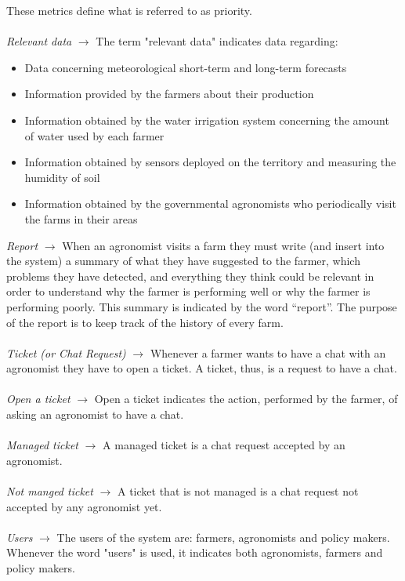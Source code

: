 \documentclass[10pt]{report}
\begin{document}
    These metrics define what is referred to as priority.
    \\ \\
    \emph{Relevant data} $\rightarrow$ The term "relevant data" indicates data regarding:
    \begin{itemize}
        \item Data concerning meteorological short-term and long-term forecasts
        \item Information provided by the farmers about their production
        \item Information obtained by the water irrigation system concerning the amount of water used by each farmer
        \item Information obtained by sensors deployed on the territory and measuring the humidity of soil
        \item Information obtained by the governmental agronomists who periodically visit the farms in their areas
    \end{itemize}
    \emph{Report} $\rightarrow$ When an agronomist visits a farm they must write (and insert into the system) a summary of what they have suggested to the farmer, which problems they have detected, and everything they think could be relevant in order to understand why the farmer is performing well or why the farmer is performing poorly. This summary is indicated by the word “report”. The purpose of the report is to keep track of the history of every farm.
    \\ \\
    \emph{Ticket (or Chat Request)} $\rightarrow$ Whenever a farmer wants to have a chat with an agronomist they have to open a ticket. A ticket, thus, is a request to have a chat.
    \\ \\
    \emph{Open a ticket} $\rightarrow$ Open a ticket indicates the action, performed by the farmer, of asking an agronomist to have a chat.
    \\ \\
    \emph{Managed ticket} $\rightarrow$ A managed ticket is a chat request accepted by an agronomist.
    \\ \\
    \emph{Not manged ticket} $\rightarrow$ A ticket that is not managed is a chat request not accepted by any agronomist yet.
    \\ \\
    \emph{Users} $\rightarrow$ The users of the system are: farmers, agronomists and policy makers. Whenever the word "users" is used, it indicates both agronomists, farmers and policy makers.
\end{document}
